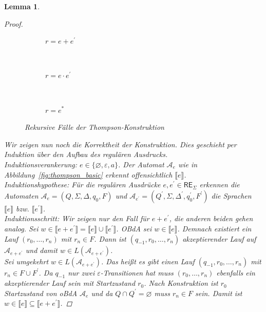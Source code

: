 \documentclass[11pt, a4paper]{article}
\theoremstyle{definition}
\theoremstyle{plain}
\newtheorem{lemma}[definition]{Lemma}
\numberwithin{equation}{section}
\let\emptyset\varnothing
\begin{document}
\begin{lemma}
\begin{proof}
		\begin{figure}
			\centering
			\begin{subfigure}[b]{.9\textwidth}
				\centering
				
				\caption{\( r = e + e^\prime \)}
				\label{fig:thompson_plus}
			\end{subfigure}\\
			\begin{subfigure}[b]{.9\textwidth}
				\centering
				
				\caption{\( r = e \cdot e^\prime \)}
				\label{fig:thompson_cat}
			\end{subfigure}\\
			\begin{subfigure}[b]{.9\textwidth}
				\centering
				
				\caption{\( r = e^\ast \)}
				\label{fig:thompson_star}
			\end{subfigure}
			\caption{Rekursive Fälle der Thompson-Konstruktion}
			\label{fig:thompson_recursive}
		\end{figure}
		Wir zeigen nun noch die Korrektheit der Konstruktion. Dies geschieht per Induktion über den Aufbau des regulären Ausdrucks.\\
		Induktionsverankerung: \( e \in \{\emptyset, \varepsilon, a\} \). Der Automat \( \mathcal{A}_e \) wie in Abbildung~\ref{fig:thompson_basic} erkennt offensichtlich \( \llbracket e \rrbracket \).\checkmark\\
		Induktionshypothese: Für die regulären Ausdrücke \( e, e^\prime \in \mathsf{RE}_\Sigma \) erkennen die Automaten \( \mathcal{A}_e = (Q, \Sigma, \Delta, q_0, F) \) und \( \mathcal{A}_{e^\prime} = (Q^\prime, \Sigma, \Delta^\prime, q_0^\prime, F^\prime) \) die Sprachen \( \llbracket e \rrbracket \) bzw. \( \llbracket e^\prime \rrbracket \).\\
		Induktionsschritt: Wir zeigen nur den Fall für \( e + e^\prime \), die anderen beiden gehen analog.
		Sei \( w \in \llbracket e + e^\prime \rrbracket = \llbracket e \rrbracket \cup \llbracket e^\prime \rrbracket \). OBdA sei \( w \in \llbracket e \rrbracket \). Demnach existiert ein Lauf \( (r_0, \ldots, r_n) \) mit \( r_n \in F \). Dann ist \( (q_{-1}, r_0, \ldots, r_n) \) akzeptierender Lauf auf \( \mathcal{A}_{e+e^\prime} \) und damit \( w \in L(\mathcal{A}_{e+e^\prime}) \).\\
		Sei umgekehrt \( w \in L(\mathcal{A}_{e+e^\prime}) \). Das heißt es gibt einen Lauf \( (q_{-1}, r_0, \ldots, r_n) \) mit \( r_n \in F \cup F^\prime \). Da \( q_{-1} \) nur zwei \(\varepsilon\)-Transitionen hat muss \( (r_0, \ldots, r_n) \) ebenfalls ein akzeptierender Lauf sein mit Startzustand \( r_0 \). Nach Konstruktion ist \( r_0 \) Startzustand von oBdA \( \mathcal{A}_e \) und da \( Q \cap Q^\prime = \emptyset \) muss \( r_n \in F \) sein. Damit ist \( w \in \llbracket e \rrbracket \subseteq \llbracket e+e^\prime \rrbracket \).
	\end{proof}
\end{lemma}
\end{document}
